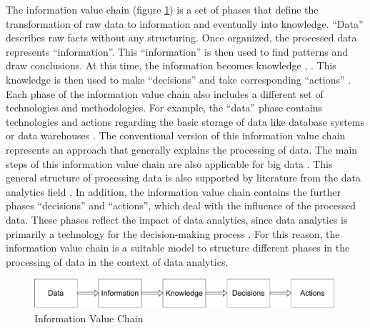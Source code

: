 The information value chain (figure \ref{information_value_chain}) is a set of phases that define the transformation of raw data to information and eventually into knowledge. \enquote{Data} describes raw facts without any structuring. Once organized, the processed data represents \enquote{information}. This \enquote{information} is then used to find patterns and draw conclusions. At this time, the information becomes knowledge \parencite{Fayyad.1996}, \cite{Fayyad.1996b}. This knowledge is then used to make \enquote{decisions} and take corresponding \enquote{actions} \parencite{Sharma.2014}. Each phase of the information value chain also includes a different set of technologies and methodologies. For example, the \enquote{data} phase contains technologies and actions regarding the basic storage of data like database systems or data warehouses \parencite{Abbasi.2016}. The conventional version of this information value chain represents an approach that generally explains the processing of data. The main steps of this information value chain are also applicable for big data \parencite{Abbasi.2016}. This general structure of processing data is also supported by literature from the data analytics field \parencite{Runkler.2020}. In addition, the information value chain contains the further phases \enquote{decisions} and \enquote{actions}, which deal with the influence of the processed data. These phases reflect the impact of data analytics, since data analytics is primarily a technology for the decision-making process \parencite{Runkler.2020}. For this reason, the information value chain is a suitable model to structure different phases in the processing of data in the context of data analytics. %

\begin{figure}[htbp]
    \includegraphics[width=0.99\textwidth, keepaspectratio]{content/02_theretical_foundations/informationValueChain.pdf}
    \caption{Information Value Chain}    
    \label{information_value_chain}
\end{figure}
